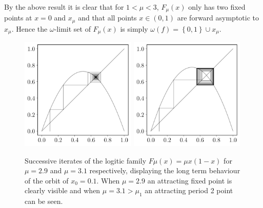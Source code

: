 \documentclass[11pt,a4paper,oneside]{memoir}
\theoremstyle{plain}
\theoremstyle{definition}
\begin{document}
By the above result it is clear that for $1 < \mu < 3$, $F_\mu(x)$ only has two fixed points at $x = 0$ and $x_\mu$ and that all points $x \in (0, 1)$ are forward asymptotic to $x_\mu$. Hence the $\omega$-limit set of $F_\mu(x)$ is simply $\omega(f) = \left\lbrace 0, 1 \right\rbrace \cup x_\mu$.

\begin{figure}[h]
    \centering
    \includegraphics[width=5.5cm]{cobweb_0.1_2.9.pdf}
    \includegraphics[width=5.5cm]{cobweb_0.1_3.1.pdf}
    \caption{Successive iterates of the logitic family $F{\mu}(x) = \mu x(1-x)$ for $\mu = 2.9$ and $\mu = 3.1$ respectively, displaying the long term behaviour of the orbit of $x_0 = 0.1$. When $\mu = 2.9$ an attracting fixed point is clearly visible and when $\mu = 3.1 > \mu_1$ an attracting period 2 point can be seen.}
    \label{fig:cobweb_2.9_3.1}
\end{figure}
\end{document}
